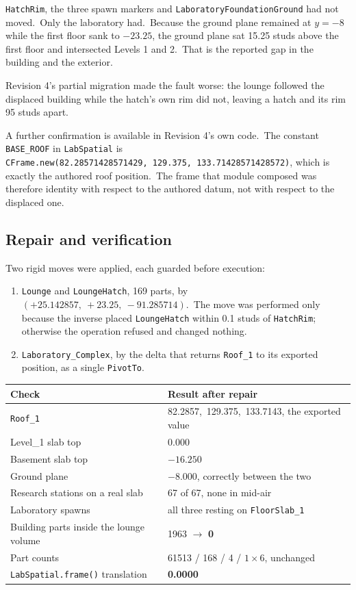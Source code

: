 \texttt{HatchRim}, the three spawn markers and
\texttt{LaboratoryFoundationGround} had not moved.\ Only the laboratory had.\
Because the ground plane remained at $y=-8$ while the first floor sank to
$-23.25$, the ground plane sat 15.25 studs above the first floor and intersected
Levels 1 and 2.\ That is the reported gap in the building and the exterior.\

Revision 4's partial migration made the fault worse: the lounge followed the
displaced building while the hatch's own rim did not, leaving a hatch and its
rim 95 studs apart.\

A further confirmation is available in Revision 4's own code.\ The constant
\texttt{BASE\_ROOF} in \texttt{LabSpatial} is
\texttt{CFrame.new(82.28571428571429,\ 129.375,\ 133.71428571428572)}, which is
exactly the authored roof position.\ The frame that module composed was
therefore identity with respect to the authored datum, not with respect to the
displaced one.\

\subsection{Repair and verification}
Two rigid moves were applied, each guarded before execution:

\begin{enumerate}
\item \texttt{Lounge} and \texttt{LoungeHatch}, 169 parts, by
      $(+25.142857,\ +23.25,\ -91.285714)$.\ The move was performed only
      because the inverse placed \texttt{LoungeHatch} within 0.1 studs of
      \texttt{HatchRim}; otherwise the operation refused and changed nothing.\
\item \texttt{Laboratory\_Complex}, by the delta that returns \texttt{Roof\_1}
      to its exported position, as a single \texttt{PivotTo}.\
\end{enumerate}

\begin{center}
\begin{tabular}{@{}ll@{}}
\toprule
\textbf{Check} & \textbf{Result after repair} \\
\midrule
\texttt{Roof\_1} & 82.2857,\ 129.375,\ 133.7143, the exported value \\
Level\_1 slab top & 0.000 \\
Basement slab top & $-16.250$ \\
Ground plane & $-8.000$, correctly between the two \\
Research stations on a real slab & 67 of 67, none in mid-air \\
Laboratory spawns & all three resting on \texttt{FloorSlab\_1} \\
Building parts inside the lounge volume & 1963 $\rightarrow$ \textbf{0} \\
Part counts & 61513 / 168 / 4 / $1\times6$, unchanged \\
\texttt{LabSpatial.frame()} translation & \textbf{0.0000} \\
\bottomrule
\end{tabular}
\end{center}

